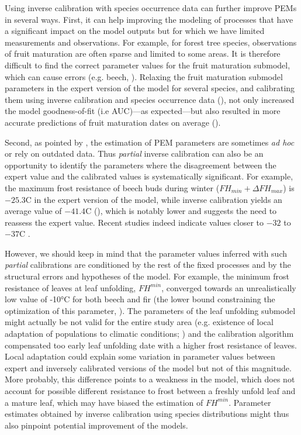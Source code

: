 \documentclass[preprint,12pt,authoryear]{elsarticle}
\begin{document}
{Using inverse calibration with species occurrence data can further improve PEMs in several ways. First, it can help improving the modeling of processes that have a significant impact on the model outputs but for which we have limited measurements and observations. For example, for forest tree species, observations of fruit maturation are often sparse and limited to some areas. It is therefore difficult to find the correct parameter values for the fruit maturation submodel, which can cause errors (e.g. beech, ). Relaxing the fruit maturation submodel parameters in the expert version of the model for several species, and calibrating them using inverse calibration and species occurrence data (), not only increased the model goodness-of-fit (i.e AUC)---as expected---but also resulted in more accurate predictions of fruit maturation dates on average ().

Second, as pointed by \cite{Harrison2021}, the estimation of PEM parameters are sometimes \emph{ad hoc} or rely on outdated data. Thus \emph{partial} inverse calibration can also be an opportunity to identify the parameters where the disagreement between the expert value and the calibrated values is systematically significant. For example, the maximum frost resistance of beech buds during winter ($FH_{min}+\Delta FH_{max}$) is $-25.3$\degree C in the expert version of the model, while inverse calibration yields an average value of $-41.4$\degree C (), which is notably lower and suggests the need to reassess the expert value. Recent studies indeed indicate values closer to $-32$ to $-37$\degree C \citep{Delaporte2015, Kreyling2014, Lenz2016, Baffoin2021, CharraVaskou2012}.
 
However, we should keep in mind that the parameter values inferred with such \emph{partial} calibrations are conditioned by the rest of the fixed processes and by the structural errors and hypotheses of the model. For example, the minimum frost resistance of leaves at leaf unfolding, ${FH}^{min}$, converged towards an unrealistically low value of -10°C for both beech and fir (the lower bound constraining the optimization of this parameter, ). The parameters of the leaf unfolding submodel might actually be not valid for the entire study area (e.g. existence of local adaptation of populations to climatic conditions; \citealp{Kreyling2014, Lazic2024}) and the calibration algorithm compensated too early leaf unfolding date with a higher frost resistance of leaves. Local adaptation could explain some variation in parameter values between expert and inversely calibrated versions of the model but not of this magnitude. More probably, this difference points to a weakness in the model, which does not account for possible different resistance to frost between a freshly unfold leaf and a mature leaf, which may have biased the estimation of ${FH}^{min}$. Parameter estimates obtained by inverse calibration using species distributions might thus also pinpoint potential improvement of the models.

}
\end{document}

